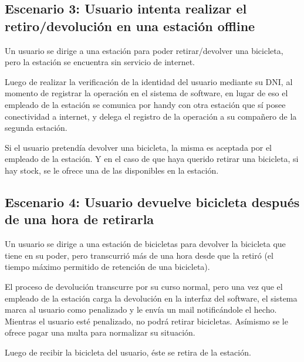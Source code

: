 \documentclass[a4paper, 10pt, twoside]{article}
\begin{document}
\subsection{Escenario 3: Usuario intenta realizar el retiro/devolución en una estación offline}

Un usuario se dirige a una estación para poder retirar/devolver una bicicleta, pero la estación se encuentra sin servicio de internet.

Luego de realizar la verificación de la identidad del usuario mediante su DNI, al momento de registrar la operación en el sistema de software, en lugar de eso el empleado de la estación se comunica por handy con otra estación que sí posee conectividad a internet, y delega el registro de la operación a su compañero de la segunda estación.

Si el usuario pretendía devolver una bicicleta, la misma es aceptada por el empleado de la estación. Y en el caso de que haya querido retirar una bicicleta, si hay stock, se le ofrece una de las disponibles en la estación.


\subsection{Escenario 4: Usuario devuelve bicicleta después de una hora de retirarla}

Un usuario se dirige a una estación de bicicletas para devolver la bicicleta que tiene en su poder, pero transcurrió más de una hora desde que la retiró (el tiempo máximo permitido de retención de una bicicleta).

El proceso de devolución transcurre por su curso normal, pero una vez que el empleado de la estación carga la devolución en la interfaz del software, el sistema marca al usuario como penalizado y le envía un mail notificándole el hecho. Mientras el usuario esté penalizado, no podrá retirar bicicletas. Asímismo se le ofrece pagar una multa para normalizar su situación.

Luego de recibir la bicicleta del usuario, éste se retira de la estación.
\end{document}
